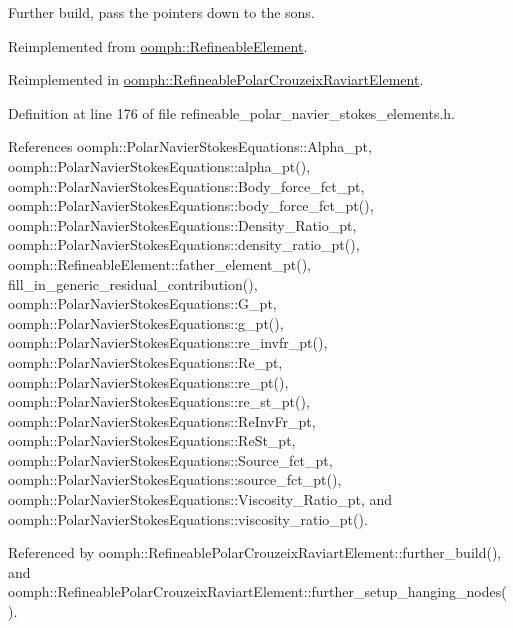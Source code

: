 Further build, pass the pointers down to the sons. 



Reimplemented from \hyperlink{classoomph_1_1RefineableElement_a26628ce36dfad028686adeb4694a9ef3}{oomph\+::\+Refineable\+Element}.



Reimplemented in \hyperlink{classoomph_1_1RefineablePolarCrouzeixRaviartElement_a140d5327220a9a7301381d1f53ddd004}{oomph\+::\+Refineable\+Polar\+Crouzeix\+Raviart\+Element}.



Definition at line 176 of file refineable\+\_\+polar\+\_\+navier\+\_\+stokes\+\_\+elements.\+h.



References oomph\+::\+Polar\+Navier\+Stokes\+Equations\+::\+Alpha\+\_\+pt, oomph\+::\+Polar\+Navier\+Stokes\+Equations\+::alpha\+\_\+pt(), oomph\+::\+Polar\+Navier\+Stokes\+Equations\+::\+Body\+\_\+force\+\_\+fct\+\_\+pt, oomph\+::\+Polar\+Navier\+Stokes\+Equations\+::body\+\_\+force\+\_\+fct\+\_\+pt(), oomph\+::\+Polar\+Navier\+Stokes\+Equations\+::\+Density\+\_\+\+Ratio\+\_\+pt, oomph\+::\+Polar\+Navier\+Stokes\+Equations\+::density\+\_\+ratio\+\_\+pt(), oomph\+::\+Refineable\+Element\+::father\+\_\+element\+\_\+pt(), fill\+\_\+in\+\_\+generic\+\_\+residual\+\_\+contribution(), oomph\+::\+Polar\+Navier\+Stokes\+Equations\+::\+G\+\_\+pt, oomph\+::\+Polar\+Navier\+Stokes\+Equations\+::g\+\_\+pt(), oomph\+::\+Polar\+Navier\+Stokes\+Equations\+::re\+\_\+invfr\+\_\+pt(), oomph\+::\+Polar\+Navier\+Stokes\+Equations\+::\+Re\+\_\+pt, oomph\+::\+Polar\+Navier\+Stokes\+Equations\+::re\+\_\+pt(), oomph\+::\+Polar\+Navier\+Stokes\+Equations\+::re\+\_\+st\+\_\+pt(), oomph\+::\+Polar\+Navier\+Stokes\+Equations\+::\+Re\+Inv\+Fr\+\_\+pt, oomph\+::\+Polar\+Navier\+Stokes\+Equations\+::\+Re\+St\+\_\+pt, oomph\+::\+Polar\+Navier\+Stokes\+Equations\+::\+Source\+\_\+fct\+\_\+pt, oomph\+::\+Polar\+Navier\+Stokes\+Equations\+::source\+\_\+fct\+\_\+pt(), oomph\+::\+Polar\+Navier\+Stokes\+Equations\+::\+Viscosity\+\_\+\+Ratio\+\_\+pt, and oomph\+::\+Polar\+Navier\+Stokes\+Equations\+::viscosity\+\_\+ratio\+\_\+pt().



Referenced by oomph\+::\+Refineable\+Polar\+Crouzeix\+Raviart\+Element\+::further\+\_\+build(), and oomph\+::\+Refineable\+Polar\+Crouzeix\+Raviart\+Element\+::further\+\_\+setup\+\_\+hanging\+\_\+nodes().

\mbox{\label{classoomph_1_1RefineablePolarNavierStokesEquations_a80fc7aa35afb102162e12240f1f2f661}} 
